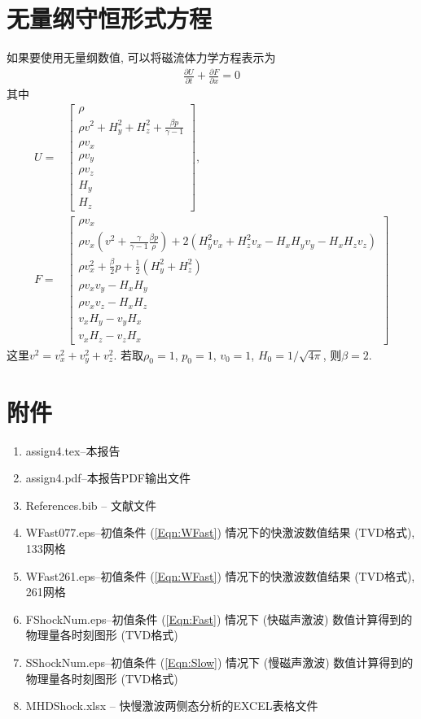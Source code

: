 \documentclass[10.5pt
]{article}
\begin{document}
\section{无量纲守恒形式方程}\label{DLess}
如果要使用无量纲数值, 可以将磁流体力学方程表示为
\begin{align}
\frac{\partial U}{\partial t} + \frac{\partial F}{\partial x} = 0 \label{Eqn:MHD}
\end{align}
其中
\begin{align}
U = & \left[ \begin{array}{l}
\rho\\
\rho v^2 + H_y^2 + H_z^2 + \frac{\beta p}{\gamma -1}
\\
\rho v_x\\
\rho v_y\\
\rho v_z\\
H_y\\
H_z
\end{array} \right], \\
F = & \left[ \begin{array}{l}
\rho v_x\\
\rho v_x \left(v^2 + \frac{\gamma}{\gamma - 1} \frac{\beta p}{\rho} \right) + 2(H_y^2 v_x + H_z^2 v_x - H_x H_y v_y - H_x H_z v_z)
\\
\rho v_x^2 + \frac{\beta}{2} p + \frac{1}{2} (H_y^2 + H_z^2)\\
\rho v_x v_y - H_x H_y\\
\rho v_x v_z - H_x H_z\\
v_x H_y - v_y H_x\\
v_x H_z - v_z H_x
\end{array} \right] \label{Eqn:Flux}
\end{align}
这里$v^2 = v_x^2 + v_y^2 + v_z^2$. 若取$\rho_0 = 1$, $p_0 = 1$, $v_0 = 1$, $H_0 = 1/\sqrt{4\pi}$, 则$\beta = 2$.

\section{附件}
\begin{enumerate}
\item
assign4.tex--本报告%
\item
assign4.pdf--本报告PDF输出文件
\item
References.bib -- 文献文件
\item
WFast077.eps--初值条件 (\ref{Eqn:WFast}) 情况下的快激波数值结果 (TVD格式), 133网格
\item
WFast261.eps--初值条件 (\ref{Eqn:WFast}) 情况下的快激波数值结果 (TVD格式), 261网格
\item
FShockNum.eps--初值条件 (\ref{Eqn:Fast}) 情况下 (快磁声激波) 数值计算得到的物理量各时刻图形 (TVD格式)
\item
SShockNum.eps--初值条件 (\ref{Eqn:Slow}) 情况下 (慢磁声激波) 数值计算得到的物理量各时刻图形 (TVD格式)
\item
MHDShock.xlsx -- 快慢激波两侧态分析的EXCEL表格文件
\end{enumerate}



\end{document}
